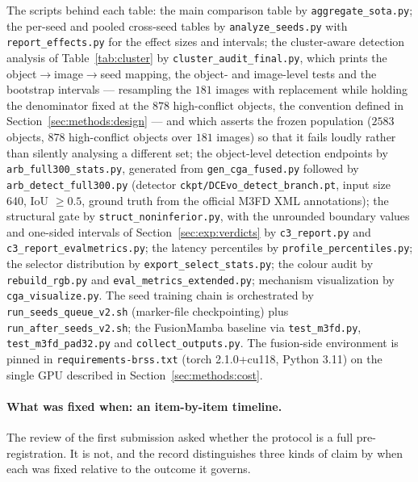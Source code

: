 \documentclass[pdflatex,sn-mathphys-num]{sn-jnl}
\theoremstyle{thmstyleone}%
\theoremstyle{thmstyletwo}%
\theoremstyle{thmstylethree}%
\begin{document}
The scripts behind each table: the main comparison table by \texttt{aggregate\_sota.py}; the per-seed and pooled cross-seed tables by \texttt{analyze\_seeds.py} with \texttt{report\_effects.py} for the effect sizes and intervals; the cluster-aware detection analysis of Table~\ref{tab:cluster} by \texttt{cluster\_audit\_final.py}, which prints the object$\to$image$\to$seed mapping, the object- and image-level tests and the bootstrap intervals --- resampling the $181$ images with replacement while holding the denominator fixed at the $878$ high-conflict objects, the convention defined in Section~\ref{sec:methods:design} --- and which asserts the frozen population ($2583$ objects, $878$ high-conflict objects over $181$ images) so that it fails loudly rather than silently analysing a different set; the object-level detection endpoints by \texttt{arb\_full300\_stats.py}, generated from \texttt{gen\_cga\_fused.py} followed by \texttt{arb\_detect\_full300.py} (detector \texttt{ckpt/DCEvo\_detect\_branch.pt}, input size 640, IoU $\geq 0.5$, ground truth from the official M3FD XML annotations); the structural gate by \texttt{struct\_noninferior.py}, with the unrounded boundary values and one-sided intervals of Section~\ref{sec:exp:verdicts} by \texttt{c3\_report.py} and \texttt{c3\_report\_evalmetrics.py}; the latency percentiles by \texttt{profile\_percentiles.py}; the selector distribution by \texttt{export\_select\_stats.py}; the colour audit by \texttt{rebuild\_rgb.py} and \texttt{eval\_metrics\_extended.py}; mechanism visualization by \texttt{cga\_visualize.py}. The seed training chain is orchestrated by \texttt{run\_seeds\_queue\_v2.sh} (marker-file checkpointing) plus \texttt{run\_after\_seeds\_v2.sh}; the FusionMamba baseline via \texttt{test\_m3fd.py}, \texttt{test\_m3fd\_pad32.py} and \texttt{collect\_outputs.py}. The fusion-side environment is pinned in \texttt{requirements-brss.txt} (torch 2.1.0+cu118, Python 3.11) on the single GPU described in Section~\ref{sec:methods:cost}.

\paragraph{What was fixed when: an item-by-item timeline.}
The review of the first submission asked whether the protocol is a full pre-registration. It is not, and the record distinguishes three kinds of claim by when each was fixed relative to the outcome it governs.
\end{document}
